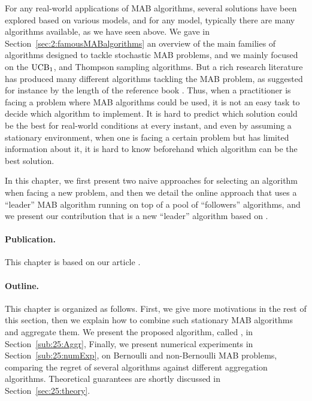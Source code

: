 For any real-world applications of MAB algorithms,
several solutions have been explored based on various models, and for any model, typically there are many algorithms available, as we have seen above.
%
We gave in Section~\ref{sec:2:famousMABalgorithms} an overview of the main families of algorithms designed to tackle stochastic MAB problems, and we mainly focused on the $\mathrm{UCB}_1$, \klUCB{} and Thompson sampling algorithms.
But a rich research literature has produced many different algorithms tackling the MAB problem, as suggested for instance by the length of the reference book \cite{LattimoreBanditAlgorithmsBook}.
%
Thus, when a practitioner is facing a problem where MAB algorithms could be used, it is not an easy task to decide which algorithm to implement.
It is hard to predict which solution could be the best for real-world conditions at every instant,
and even by assuming a stationary environment, when one is facing a certain problem but has limited information about it, it is hard to know beforehand which algorithm can be the best solution.

In this chapter, we first present two naive approaches for selecting an algorithm when facing a new problem, and then we detail the online approach that uses a ``leader'' MAB algorithm running on top of a pool of ``followers'' algorithms, and we present our contribution that is a new ``leader'' algorithm based on \ExpQ.


\paragraph{Publication.}
%
This chapter is based on our article \cite{Besson2018WCNC}.


\paragraph{Outline.}
%
This chapter is organized as follows.
First, we give more motivations in the rest of this section, then we explain how to combine such stationary MAB algorithms and aggregate them.
We present the proposed algorithm, called \Aggr, in Section~\ref{sub:25:Aggr},
Finally, we present numerical experiments in Section~\ref{sub:25:numExp},
on Bernoulli and non-Bernoulli MAB problems,
comparing the regret of several algorithms against different aggregation algorithms.
Theoretical guarantees are shortly discussed in Section~\ref{sec:25:theory}.


